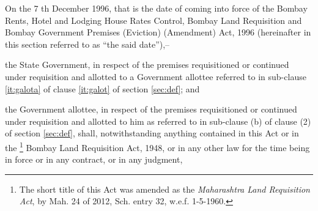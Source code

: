 \documentclass{mhact}
\begin{document}
\begin{subsectionlist}
\item On the 7 th December 1996, that is the date of coming into force
  of the Bombay Rents, Hotel and Lodging House Rates Control, Bombay
  Land Requisition and Bombay Government Premises (Eviction)
  (Amendment) Act, 1996 (hereinafter in
  this section referred to as ``the said date''),--
  \begin{clause}
  \item the State Government, in respect of the premises requisitioned
    or continued under requisition and allotted to a Government
    allottee referred to in sub-clause \ref{it:galota} of clause
    \ref{it:galot} of section
    \ref{sec:def};
    and
  \item the Government allottee, in respect of the premises
    requisitioned or continued under requisition and allotted to him
    as referred to in sub-clause (b) of clause (2) of section
    \ref{sec:def}, shall, notwithstanding anything contained in this
    Act or in the \footnote{The short title of this Act was amended as
      the \emph{Maharashtra Land Requisition Act}, by Mah. 24 of 2012,
      Sch. entry 32, w.e.f. 1-5-1960.  } Bombay Land Requisition Act,
    1948, or in any other law for the time being in force or in any
    contract, or in any judgment,
  \end{clause}
\end{subsectionlist}
\end{document}
